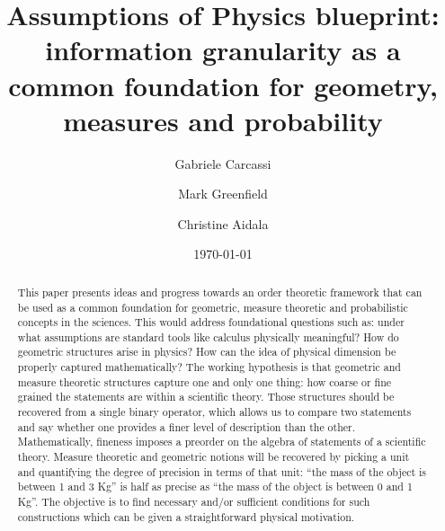 \documentclass[10pt, onecolumn, longbibliography, nofootinbib]{revtex4-2}
\begin{document}
\title{Assumptions of Physics blueprint: information granularity as a common foundation for geometry, measures and probability}
\author{Gabriele Carcassi}
\author{Mark Greenfield}
\author{Christine Aidala}
\date{\today}

\begin{abstract}
    This paper presents ideas and progress towards an order theoretic framework that can be used as a common foundation for geometric, measure theoretic and probabilistic concepts in the sciences. This would address foundational questions such as: under what assumptions are standard tools like calculus physically meaningful? How do geometric structures arise in physics? How can the idea of physical dimension be properly captured mathematically? The working hypothesis is that geometric and measure theoretic structures capture one and only one thing: how coarse or fine grained the statements are within a scientific theory. Those structures should be recovered from a single binary operator, which allows us to compare two statements and say whether one provides a finer level of description than the other. Mathematically, fineness imposes a preorder on the algebra of statements of a scientific theory. Measure theoretic and geometric notions will be recovered by picking a unit and quantifying the degree of precision in terms of that unit: ``the mass of the object is between 1 and 3 Kg'' is half as precise as ``the mass of the object is between 0 and 1 Kg''. The objective is to find necessary and/or sufficient conditions for such constructions which can be given a straightforward physical motivation.
    

\end{abstract}
\end{document}
